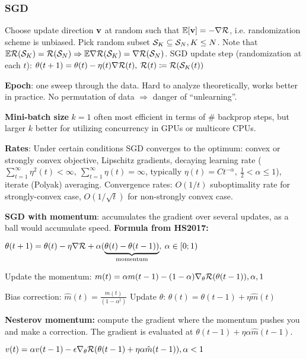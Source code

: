     \subsubsection{SGD}
    \label{ssub:sgd}
        Choose update direction $\mathbf v$ at random such that $\mathbb E\lbrack\mathbf v\rbrack=-\nabla\mathcal{R}$, i.e. randomization scheme is unbiased. Pick random subset $\mathcal{S}_K\subseteq\mathcal{S}_N, K\leq N$. Note that $\mathbb E\mathcal{R}(\mathcal{S}_K)=\mathcal{R}(\mathcal{S}_N)\Rightarrow\mathbb E\nabla\mathcal{R}(\mathcal{S}_K)=\nabla\mathcal{R}(\mathcal{S}_N)$. SGD update step (randomization at each $t$): \tab$\theta(t+1)=\theta(t)-\eta(t)\nabla\mathcal{R}(t),\>\mathcal{R}(t)\coloneqq\mathcal{R}(\mathcal{S}_K(t))$
        
        \textbf{Epoch}: one sweep through the data. Hard to analyze theoretically, works better in practice. No permutation of data $\Rightarrow$ danger of ``unlearning''.
        
        \textbf{Mini-batch size} $k=1$ often most efficient in terms of \# backprop steps, but larger $k$ better for utilizing concurrency in GPUs or multicore CPUs.
        
        \textbf{Rates}: Under certain conditions SGD converges to the optimum: convex or strongly convex objective, Lipschitz gradients, decaying learning rate ($\sum^\infty_{t=1}\eta^2(t)<\infty,\>\sum^\infty_{t=1}\eta(t)=\infty$, typically $\eta(t)=C t^{-\alpha},\>\frac{1}{2}<\alpha\leq1$), iterate (Polyak) averaging. Convergence rates: $O(1/t)$ suboptimality rate for strongly-convex case, $O(1/\sqrt{t})$ for non-strongly convex case.
        
        \textbf{SGD with momentum}: accumulates the gradient over several updates, as a ball would accumulate speed. \textbf{Formula from HS2017:}
        
        \tab$\theta(t+1)=\theta(t)-\eta\nabla\mathcal{R}+\alpha(\underbrace{\theta(t)-\theta(t-1))}_\text{momentum},\>\alpha\in\lbrack0;1)$
        
        Update the momentum:
        $m(t)=\alpha m(t-1)-(1-\alpha)\nabla_\theta\mathcal{R}(\theta(t-1)), \alpha,1$
        
        Bias correction: $\hat{m}(t)=\frac{m(t)}{(1-\alpha^t)}$
        Update $\theta$: $\theta(t)=\theta(t-1)+\eta \hat{m}(t)$
        
        \textbf{Nesterov momentum:} compute the gradient where the momentum pushes you and make a correction. 
        The gradient is evaluated at $\theta(t-1)+\eta\alpha\hat{m}(t-1)$.
        
        \tab$v(t)=\alpha v(t-1)-\epsilon\nabla_\theta\mathcal{R}(\theta(t-1)+\eta\alpha\hat{m}(t-1)), \alpha<1$
        
